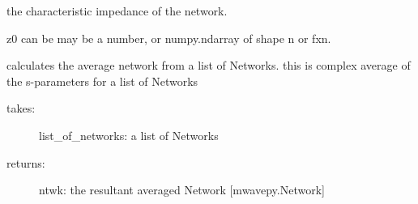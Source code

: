 \documentclass[letterpaper,10pt,english]{sphinxmanual}
\begin{document}
\begin{fulllineitems}
\begin{fulllineitems}
\begin{description}
\end{description}

\end{fulllineitems}


\begin{fulllineitems}
\label{api/mwavepy:mwavepy.network.Network.y}
\end{fulllineitems}


\begin{fulllineitems}
\label{api/mwavepy:mwavepy.network.Network.z0}
the characteristic impedance of the network.

z0 can be may be a number, or numpy.ndarray of shape n or fxn.

\end{fulllineitems}


\end{fulllineitems}


\begin{fulllineitems}
\label{api/mwavepy:mwavepy.network.average}
calculates the average network from a list of Networks. 
this is complex average of the s-parameters for a  list of Networks
\begin{description}
\item[{takes:}] \leavevmode
list\_of\_networks: a list of Networks

\item[{returns:}] \leavevmode
ntwk: the resultant averaged Network {[}mwavepy.Network{]}

\end{description}

\end{fulllineitems}

\end{document}
